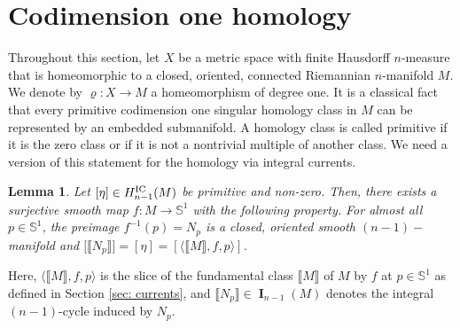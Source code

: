\documentclass{amsart}
\newtheorem{lemma}[theorem]{Lemma}
\numberwithin{equation}{section}
\DeclareMathOperator{\bI}{\mathbf{I}}
\newcommand{\bb}[1]{\llbracket #1\rrbracket}
\begin{document}

\section{Codimension one homology}    
     Throughout this section, let $X$ be a metric space with finite Hausdorff $n$-measure that is homeomorphic to a closed, oriented, connected Riemannian $n$-manifold $M$. We denote by $\varrho\colon X \to M$ a homeomorphism of degree one. It is a classical fact that every primitive codimension one singular homology class in $M$ can be represented by an embedded submanifold. A homology class is called primitive if it is the zero class or if it is not a nontrivial multiple of another class. We need a version of this statement for the homology via integral currents. 
   

    \begin{lemma}\label{lemma: topog-repr-homo-class-map-into-S1}
        Let $[\eta] \in H_{n-1}^\textup{IC}(M)$ be primitive and non-zero. Then, there exists a surjective smooth map $f\colon M \to  \mathbb{S}^1$ with the following property. For almost all $p \in \mathbb{S}^1$, the preimage $f^{-1}(p) = N_p$ is a closed, oriented smooth $(n-1)-$manifold and $\big[ \bb{N_p} \big] =  [\eta] = [\langle \bb{M},f,p\rangle]$.
    \end{lemma}

    Here, $\langle \bb{M},f,p\rangle$ is the slice of the fundamental class $\bb{M}$ of $M$ by $f$ at $p\in \mathbb{S}^1$ as defined in Section \ref{sec: currents}, and $\bb{N_p} \in \bI_{n-1}(M)$ denotes the integral $(n-1)$-cycle induced by $N_p$.
\end{document}
